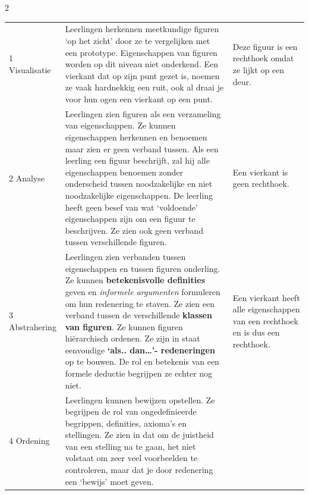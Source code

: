 \begin{multicols}{2}

\end{multicols}

\begin{tabel}
	\begin{tabular}{|m{2.5cm}|m{9cm}|m{3cm}|}
		\hline
		\tableheader{Niveau} & \tableheader{Omschrijving} & \tableheader{Uitspraken van leerlingen}\\ 
		\hline\rowcolor{white}
		1 Visualisatie  & Leerlingen herkennen meetkundige figuren `op het zicht' door ze te vergelijken met een prototype.
        Eigenschappen van figuren worden op dit niveau niet onderkend.
        Een vierkant dat op zijn punt gezet is, noemen ze vaak hardnekkig een ruit, ook al draai je voor hun ogen een vierkant op een punt. & Deze figuur is een rechthoek omdat ze lijkt op een deur. \\ 
		\hline\rowcolor{white}
		2 Analyse & Leerlingen zien figuren als een verzameling van eigenschappen.
        Ze kunnen eigenschappen herkennen en benoemen maar zien er geen verband tussen.
        Als een leerling een figuur beschrijft, zal hij alle eigenschappen benoemen zonder onderscheid tussen noodzakelijke en niet noodzakelijke eigenschappen.
        De leerling heeft geen besef van wat `voldoende' eigenschappen zijn om een figuur te beschrijven.
        Ze zien ook geen verband tussen verschillende figuren. & Een vierkant is geen rechthoek.\\ 
		\hline\rowcolor{\rubriekkleur!30}
		3 Abstrahering  & Leerlingen zien verbanden tussen eigenschappen en tussen figuren onderling.
        Ze kunnen \textbf{betekenisvolle definities} geven en \emph{informele argumenten} formuleren om hun redenering te staven.
        Ze zien een verband tussen de verschillende \textbf{klassen van figuren}.
        Ze kunnen figuren hiërarchisch ordenen.
        Ze zijn in staat eenvoudige \textbf{`als.. dan\ldots'- redeneringen} op te bouwen.
        De rol en betekenis van een formele deductie begrijpen ze echter nog niet. & Een vierkant heeft alle eigenschappen van een rechthoek en is dus een rechthoek.\\ 
		\hline\rowcolor{white}
		4 Ordening  & Leerlingen kunnen bewijzen opstellen.
        Ze begrijpen de rol van ongedefinieerde begrippen, definities, axioma's en stellingen.
        Ze zien in dat om de juistheid van een stelling na te gaan, het niet volstaat om zeer veel voorbeelden te controleren, maar dat je door redenering een `bewijs' moet geven.

\end{tabular}
\end{tabel}
